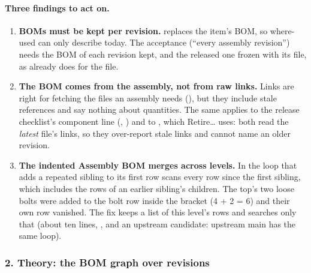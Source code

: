 \paragraph{Three findings to act on.}
\begin{enumerate}[nosep]
  \item \textbf{BOMs must be kept per revision.}  replaces the item's BOM, so
        where-used can only describe today. The acceptance (``every assembly revision'') needs the BOM of each revision
        kept, and the released one frozen with its file, as  already does for the file.
  \item \textbf{The BOM comes from the assembly, not from raw links.} Links are right for fetching the files an assembly
        needs (), but they include stale references and say nothing about quantities. The same applies to
        the release checklist's component line (, ) and to
        , which Retire\ldots{} uses: both read the \emph{latest} file's links, so they
        over-report stale links and cannot name an older revision.
  \item \textbf{The indented Assembly BOM merges across levels.} In  the loop that
        adds a repeated sibling to its first row scans every row since the first sibling, which includes the rows of an
        earlier sibling's children. The top's two loose bolts were added to the bolt row inside the bracket (4 + 2 = 6)
        and their own row vanished. The fix keeps a list of this level's rows and searches only that (about ten lines,
        \code{[BW]}, and an upstream candidate: upstream main has the same loop).
\end{enumerate}

\subsubsection*{2. Theory: the BOM graph over revisions}

